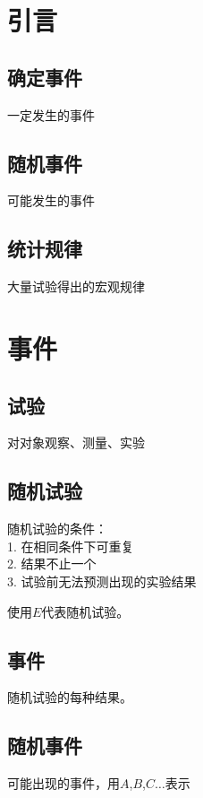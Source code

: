 \def\lecturer{SongHao}
\def\noter{THF}
\def\className{Probability Theory and Mathematical Statistics}
\def\term{III-A}



\maketitle
\tableofcontents
\section{引言}%
\label{sec:引言}
\subsection{确定事件}%
\label{sub:确定事件}
一定发生的事件
\subsection{随机事件}
可能发生的事件
\subsection{统计规律}%
\label{sub:统计规律}
大量试验得出的宏观规律
\section{事件}%
\label{sec:事件}
\subsection{试验}%
\label{sub:试验}
对对象观察、测量、实验
\subsection{随机试验}%
\label{sub:随机试验}
随机试验的条件：\\
1. 在相同条件下可重复\\
2. 结果不止一个\\
3. 试验前无法预测出现的实验结果

使用$E$代表随机试验。
\subsection{事件}%
\label{sub:事件}
随机试验的每种结果。
\subsection{随机事件}%
\label{sub:随机事件}
可能出现的事件，用$A$,$B$,$C\dots$表示
